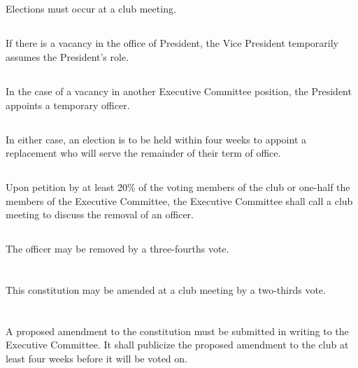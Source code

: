 \documentclass{bylaws}
\begin{document}
\subsection{}Elections must occur at a club meeting.

\subsection{}If there is a vacancy in the office of President, the Vice President temporarily assumes the President's role.
\subsection{}In the case of a vacancy in another Executive Committee position, the President appoints a temporary officer.
\subsection{}In either case, an election is to be held within four weeks to appoint a replacement who will serve the remainder of their term of office.

\subsection{}Upon petition by at least 20\% of the voting members of the club or one-half the members of the Executive Committee, the Executive Committee shall call a club meeting to discuss the removal of an officer.
\subsection{}The officer may be removed by a three-fourths vote.


\section{}This constitution may be amended at a club meeting by a two-thirds vote.
\section{}A proposed amendment to the constitution must be submitted in writing to the Executive Committee. It shall publicize the proposed amendment to the club at least four weeks before it will be voted on.
\end{document}
